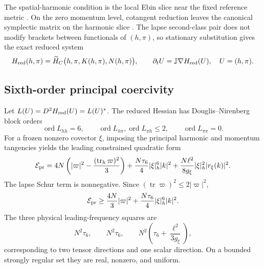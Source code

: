 \documentclass[aps,prd,reprint,onecolumn,notitlepage,nofootinbib,longbibliography,floatfix]{revtex4-2}
\theoremstyle{scstyle}
\theoremstyle{definition}
\theoremstyle{remark}
\begin{document}
The spatial-harmonic condition is the local Ebin slice near the fixed reference metric \cite{Ebin,AnderssonMoncrief}.  On the zero momentum level, cotangent reduction leaves the canonical symplectic matrix on the harmonic slice \cite{MarsdenWeinstein}.  The lapse second-class pair does not modify brackets between functionals of $(h,\pi)$, so stationary substitution gives the exact reduced system
\begin{equation}
 H_{\rm red}(h,\pi)=\widetilde H_C\bigl(h,\pi,K(h,\pi),N(h,\pi)\bigr),
 \qquad
 \partial_tU=\mathbb J\nabla H_{\rm red}(U),\quad U=(h,\pi).
 \label{eq:compReducedFlow}
\end{equation}

\subsection{Sixth-order principal coercivity}
Let $L(U)=D^2H_{\rm red}(U)=L(U)^*$.  The reduced Hessian has Douglis--Nirenberg block orders
\begin{equation}
 \operatorname{ord}L_{hh}=6,\qquad
 \operatorname{ord}L_{h\pi},\operatorname{ord}L_{\pi h}\le2,\qquad
 \operatorname{ord}L_{\pi\pi}=0.
 \label{eq:compOrders}
\end{equation}
For a frozen nonzero covector $\xi$, imposing the principal harmonic and momentum tangencies yields the leading constrained quadratic form
\begin{equation}
 \mathcal E_{\rm pr}=
 4N\left(|\varpi|^2-\frac{(\operatorname{tr}_h\varpi)^2}{3}\right)
 +\frac{N\tau_6}{4}|\xi|_h^6|k|^2
 +\frac{N\ell^2}{8g_\xi}|\xi|_h^2|r_\xi(k)|^2.
 \label{eq:compPrincipalEnergy}
\end{equation}
The lapse Schur term is nonnegative.  Since $(\operatorname{tr}\varpi)^2\le2|\varpi|^2$,
\begin{equation}
 \mathcal E_{\rm pr}\ge
 \frac{4N}{3}|\varpi|^2+\frac{N\tau_6}{4}|\xi|_h^6|k|^2.
 \label{eq:compPrincipalCoercivity}
\end{equation}
The three physical leading-frequency squares are
\begin{equation}
 N^2\tau_6,\qquad N^2\tau_6,\qquad
 N^2\left(\tau_6+\frac{\ell^2}{3g_\xi}\right),
 \label{eq:compLeadingFreq}
\end{equation}
corresponding to two tensor directions and one scalar direction.  On a bounded strongly regular set they are real, nonzero, and uniform.
\end{document}
